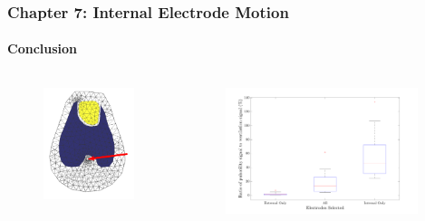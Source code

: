 \documentclass[10pt,    %
    english,            %
    xcolor=table,       %
    envcountsect,        %
    aspectratio=1610
]{beamer}
\begin{document}
\begin{frame}
	\frametitle{Chapter 7: Internal Electrode Motion}
	\framesubtitle{Conclusion}
	\begin{columns}[c]
		\begin{column}{0.25\textwidth}
			\begin{figure}[H]
				\centering
				\includegraphics[width=\textwidth,trim={0cm 0.6cm 0 0cm},clip]{internal_probe_location.png}
			\end{figure}
		\end{column}
		\begin{column}{0.75\textwidth}
			\begin{figure}[H]
				\centering
				\includegraphics[width=0.95\textwidth,trim={0cm 0.6cm 0 0cm},clip]{amplitude_ratio.pdf}
			\end{figure}
		\end{column}
	\end{columns}
\end{frame}
\end{document}
